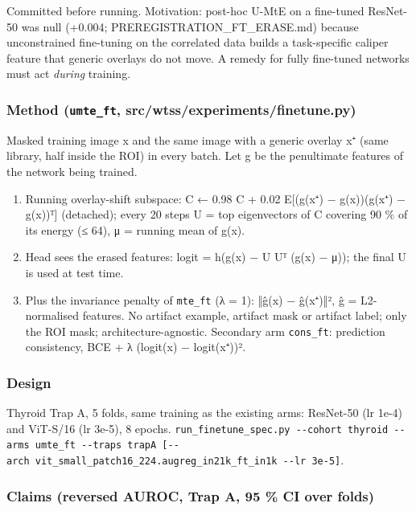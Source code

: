 {\small
Committed before running. Motivation: post-hoc U-MtE on a fine-tuned ResNet-50 was null (+0.004;
PREREGISTRATION\_FT\_ERASE.md) because unconstrained fine-tuning on the correlated data builds a task-specific caliper
feature that generic overlays do not move. A remedy for fully fine-tuned networks must act \emph{during} training.

\subsubsection{\texorpdfstring{Method (\texttt{umte\_ft}, src/wtss/experiments/finetune.py)}{Method (umte\_ft, src/wtss/experiments/finetune.py)}}\label{method-umte_ft-srcwtssexperimentsfinetunepy}

Masked training image x and the same image with a generic overlay x⁺ (same library, half inside the ROI) in every
batch. Let g be the penultimate features of the network being trained.

\begin{enumerate}
\def\labelenumi{\arabic{enumi}.}

\item
  Running overlay-shift subspace: C ← 0.98 C + 0.02 E{[}(g(x⁺) − g(x))(g(x⁺) − g(x))ᵀ{]} (detached); every 20 steps U =
  top eigenvectors of C covering 90 \% of its energy (≤ 64), μ = running mean of g(x).
\item
  Head sees the erased features: logit = h(g(x) − U Uᵀ (g(x) − μ)); the final U is used at test time.
\item
  Plus the invariance penalty of \texttt{mte\_ft} (λ = 1): ‖ĝ(x) − ĝ(x⁺)‖², ĝ = L2-normalised features.
  No artifact example, artifact mask or artifact label; only the ROI mask; architecture-agnostic.
  Secondary arm \texttt{cons\_ft}: prediction consistency, BCE + λ (logit(x) − logit(x⁺))².
\end{enumerate}

\subsubsection{Design}\label{design}

Thyroid Trap A, 5 folds, same training as the existing arms: ResNet-50 (lr 1e-4) and ViT-S/16 (lr 3e-5), 8 epochs.
\texttt{run\_finetune\_spec.py\ -\/-cohort\ thyroid\ -\/-arms\ umte\_ft\ -\/-traps\ trapA\ {[}-\/-arch\ vit\_small\_patch16\_224.augreg\_in21k\_ft\_in1k\ -\/-lr\ 3e-5{]}}.

\subsubsection{Claims (reversed AUROC, Trap A, 95 \% CI over folds)}\label{claims-reversed-auroc-trap-a-95--ci-over-folds}

}
